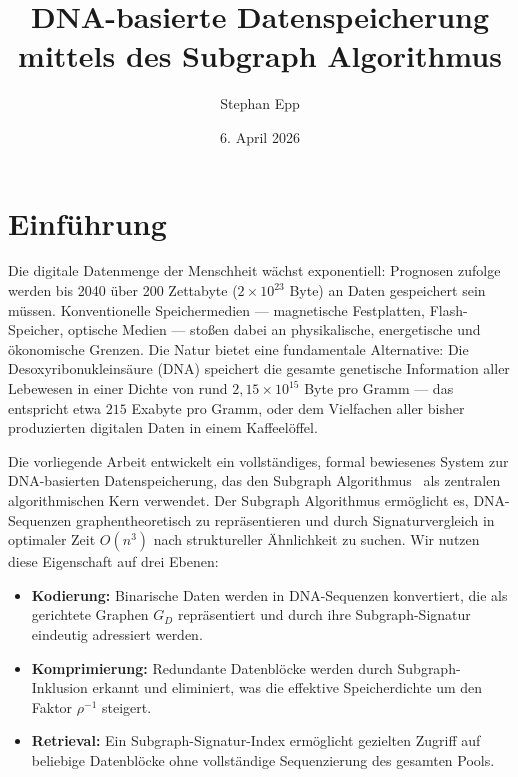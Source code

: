 ﻿\documentclass[a4paper,12pt]{article}
\title{DNA-basierte Datenspeicherung\\
       mittels des Subgraph Algorithmus}
\author{Stephan Epp}
\date{6. April 2026}
\theoremstyle{definition}
\begin{document}
\maketitle
\tableofcontents
\newpage

\section{Einf\"{u}hrung}

Die digitale Datenmenge der Menschheit w\"{a}chst exponentiell: Prognosen
zufolge werden bis 2040 \"{u}ber 200 Zettabyte ($2 \times 10^{23}$ Byte)
an Daten gespeichert sein m\"{u}ssen. Konventionelle Speichermedien ---
magnetische Festplatten, Flash-Speicher, optische Medien --- sto\ss{}en
dabei an physikalische, energetische und \"{o}konomische Grenzen.
Die Natur bietet eine fundamentale Alternative: Die
Desoxyribonukleins\"{a}ure (DNA) speichert die gesamte genetische
Information aller Lebewesen in einer Dichte von rund
$2{,}15 \times 10^{15}$ Byte pro Gramm --- das entspricht etwa $215$ Exabyte
pro Gramm, oder dem Vielfachen aller bisher produzierten digitalen Daten
in einem Kaffeel\"{o}ffel.

Die vorliegende Arbeit entwickelt ein vollst\"{a}ndiges, formal bewiesenes
System zur DNA-basierten Datenspeicherung, das den Subgraph
Algorithmus~\cite{epp2026} als zentralen algorithmischen Kern verwendet.
Der Subgraph Algorithmus erm\"{o}glicht es, DNA-Sequenzen graphentheoretisch
zu repr\"{a}sentieren und durch Signaturvergleich in optimaler Zeit
$O(n^3)$ nach struktureller \"{A}hnlichkeit zu suchen. Wir nutzen diese
Eigenschaft auf drei Ebenen:
\begin{itemize}
    \item \textbf{Kodierung:} Binarische Daten werden in DNA-Sequenzen
          konvertiert, die als gerichtete Graphen $G_D$ repr\"{a}sentiert
          und durch ihre Subgraph-Signatur eindeutig adressiert werden.
    \item \textbf{Komprimierung:} Redundante Datenbl\"{o}cke werden durch
          Subgraph-Inklusion erkannt und eliminiert, was die effektive
          Speicherdichte um den Faktor $\rho^{-1}$ steigert.
    \item \textbf{Retrieval:} Ein Subgraph-Signatur-Index erm\"{o}glicht
          gezielten Zugriff auf beliebige Datenbl\"{o}cke ohne vollst\"{a}ndige
          Sequenzierung des gesamten Pools.
\end{itemize}
\end{document}
